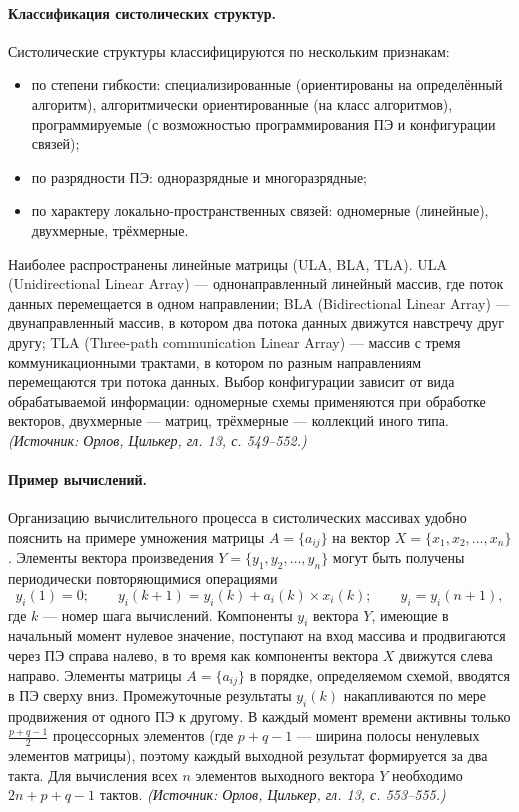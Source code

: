 \documentclass[a4paper,12pt]{article}
\begin{document}
\paragraph{Классификация систолических структур.}
Систолические структуры классифицируются по нескольким признакам:
\begin{itemize}
\item по степени гибкости: специализированные (ориентированы на определённый алгоритм), алгоритмически ориентированные (на класс алгоритмов), программируемые (с возможностью программирования ПЭ и конфигурации связей);
\item по разрядности ПЭ: одноразрядные и многоразрядные;
\item по характеру локально-пространственных связей: одномерные (линейные), двухмерные, трёхмерные.
\end{itemize}
Наиболее распространены линейные матрицы (ULA, BLA, TLA). ULA (Unidirectional Linear Array) — однонаправленный линейный массив, где поток данных перемещается в одном направлении; BLA (Bidirectional Linear Array) — двунаправленный массив, в котором два потока данных движутся навстречу друг другу; TLA (Three-path communication Linear Array) — массив с тремя коммуникационными трактами, в котором по разным направлениям перемещаются три потока данных. Выбор конфигурации зависит от вида обрабатываемой информации: одномерные схемы применяются при обработке векторов, двухмерные — матриц, трёхмерные — коллекций иного типа.
\textit{(Источник: Орлов, Цилькер, гл. 13, с. 549--552.)}

\paragraph{Пример вычислений.}
Организацию вычислительного процесса в систолических массивах удобно пояснить на примере умножения матрицы \(A=\{a_{ij}\}\) на вектор \(X=\{x_1,x_2,\ldots,x_n\}\). Элементы вектора произведения \(Y=\{y_1,y_2,\ldots,y_n\}\) могут быть получены периодически повторяющимися операциями
\[
y_i(1)=0;\qquad y_i(k+1)=y_i(k)+a_i(k)\times x_i(k);\qquad y_i=y_i(n+1),
\]
где \(k\) — номер шага вычислений. Компоненты \(y_i\) вектора \(Y\), имеющие в начальный момент нулевое значение, поступают на вход массива и продвигаются через ПЭ справа налево, в то время как компоненты вектора \(X\) движутся слева направо. Элементы матрицы \(A=\{a_{ij}\}\) в порядке, определяемом схемой, вводятся в ПЭ сверху вниз. Промежуточные результаты \(y_i(k)\) накапливаются по мере продвижения от одного ПЭ к другому. В каждый момент времени активны только \(\frac{p+q-1}{2}\) процессорных элементов (где \(p+q-1\) — ширина полосы ненулевых элементов матрицы), поэтому каждый выходной результат формируется за два такта. Для вычисления всех \(n\) элементов выходного вектора \(Y\) необходимо \(2n+p+q-1\) тактов.
\textit{(Источник: Орлов, Цилькер, гл. 13, с. 553--555.)}
\end{document}

